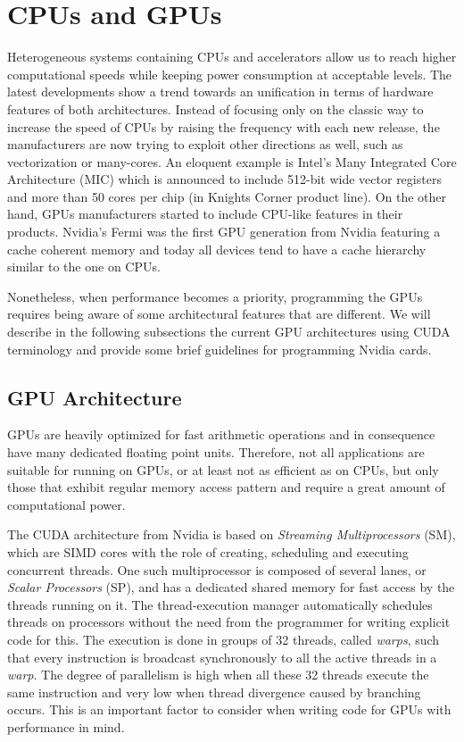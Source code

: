 \section{CPUs and GPUs}
\label{sec:cpus_vs_gpus}
Heterogeneous systems containing CPUs and accelerators allow us to reach higher
computational speeds while keeping power consumption at acceptable levels. The
latest developments show a trend towards an unification in terms of hardware
features of both architectures. Instead of focusing only on the classic way to
increase the speed of CPUs by raising the frequency with each new release, the
manufacturers are now trying to exploit other directions as well, such as
vectorization or many-cores. An eloquent example is Intel's Many Integrated
Core Architecture (MIC) \cite{intel_mic} which is announced to include 512-bit
wide vector registers and more than 50 cores per chip (in Knights Corner product
line). On the other hand, GPUs manufacturers started to include CPU-like
features in their products. Nvidia's Fermi \cite{fermi} was the first GPU
generation from Nvidia featuring a cache coherent memory and today all devices
tend to have a cache hierarchy similar to the one on CPUs.

Nonetheless, when performance becomes a priority, programming the GPUs requires
being aware of some architectural features that are different. We will describe
in the following subsections the current GPU architectures using CUDA terminology and
provide some brief guidelines for programming Nvidia cards.

\subsection{GPU Architecture}

GPUs are heavily optimized for fast arithmetic operations and in consequence
have many dedicated floating point units. Therefore, not all applications are
suitable for running on GPUs, or at least not as efficient as on CPUs, but only
those that exhibit regular memory access pattern and require a great amount of
computational power.

The CUDA architecture from Nvidia is based on \textit{Streaming Multiprocessors}
(SM), which are SIMD cores with the role of creating, scheduling and executing
concurrent threads. One such multiprocessor is composed of several lanes, or
\textit{Scalar Processors} (SP), and has a dedicated shared memory for fast
access by the threads running on it. The thread-execution manager automatically
schedules threads on processors without the need from the programmer for writing
explicit code for this. The execution is done in groups of 32 threads, called
\textit{warps}, such that every instruction is broadcast synchronously to all
the active threads in a \textit{warp}. The degree of parallelism is high when
all these 32 threads execute the same instruction and very low when thread
divergence caused by branching occurs. This is an important factor to consider
when writing code for GPUs with performance in mind.

